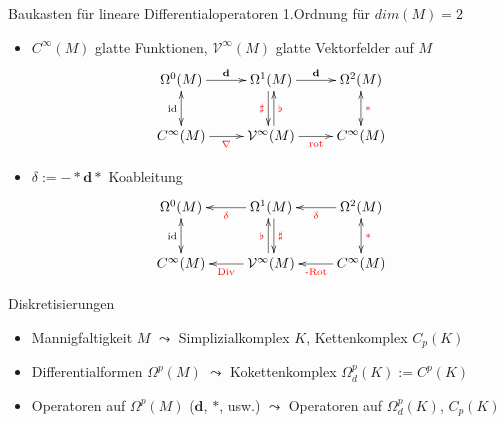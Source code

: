 \documentclass[handout]{beamer}
\newcommand{\exd}{\mathbf{d}}
\newcommand{\tred}[1]{\textcolor{red}{#1}}
\begin{document}
  \begin{frame}
    \begin{block}{Baukasten für lineare Differentialoperatoren 1.Ordnung für \( dim(M)=2 \)}
      \begin{itemize}
        \item<1-> \( C^{\infty}(M) \) glatte Funktionen, \( \mathcal{V}^{\infty}(M) \) glatte Vektorfelder auf \( M \)
          \begin{align*}
            \begin{xy} \xymatrix{
                \Omega^{0}(M) \ar[r]^{\exd} & \Omega^{1}(M) \ar[r]^{\exd} \ar@<-2pt>[d]_{\tred{\sharp}} & \Omega^{2}(M) \ar@{<->}[d]^{\tred{*}}\\
                C^{\infty}(M) \ar[r]_{\tred{\nabla}} \ar@{<->}[u]^{\text{id}} & \mathcal{V}^{\infty}(M) \ar[r]_{\tred{\text{rot}}} \ar@<-2pt>[u]_{\tred{\flat}} & C^{\infty}(M) }
            \end{xy}
          \end{align*}

        \item<2-> \( \delta := -*\exd * \) Koableitung
          \begin{align*}
            \begin{xy} \xymatrix{
              \Omega^{0}(M) \ar@{<->}[d]_{\text{id}} & \Omega^{1}(M) \ar[l]^{\tred{\delta}} \ar@<2pt>[d]^{\tred{\sharp}} & \Omega^{2}(M) \ar[l]^{\tred{\delta}}\\
              C^{\infty}(M) & \mathcal{V}^{\infty}(M) \ar[l]^{\tred{\text{Div}}} \ar@<2pt>[u]^{\tred{\flat}} & C^{\infty}(M) \ar[l]^{\tred{\text{-Rot}}} \ar@{<->}[u]_{\tred{*}} }
            \end{xy}
          \end{align*}
      \end{itemize}
    \end{block}
  \end{frame}

  \begin{frame}
    \begin{block}{Diskretisierungen}
      \begin{itemize}
        \item<1-> Mannigfaltigkeit \(M\) \( \leadsto \) Simplizialkomplex \( K \), Kettenkomplex \( C_{p}(K) \)
        \item<2-> Differentialformen \( \Omega^{p}(M) \) \( \leadsto \) Kokettenkomplex \( \Omega^{p}_{d}(K) :=   C^{p}(K)\)
        \item<3-> Operatoren auf \( \Omega^{p}(M) \) (\( \exd \), \( * \), usw.) \( \leadsto \) Operatoren auf \( \Omega^{p}_{d}(K) \), \( C_{p}(K) \)
      \end{itemize}
    \end{block}
  \end{frame}
\end{document}
